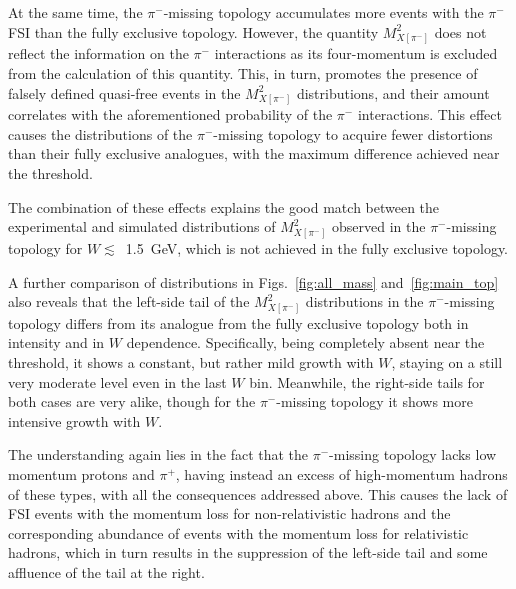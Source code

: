 At the same time, the $\pi^{-}$-missing topology accumulates more events with the $\pi^{-}$ FSI than the fully exclusive topology. However, the quantity $M^{2}_{X[\pi^{-}]}$ does not reflect the information on the $\pi^{-}$ interactions as its four-momentum is excluded from the calculation of this quantity. This, in turn, promotes the presence of falsely defined quasi-free events in the $M^{2}_{X[\pi^{-}]}$ distributions, and their amount correlates with the aforementioned probability of the $\pi^{-}$ interactions. This effect causes the distributions of the $\pi^{-}$-missing topology to acquire fewer distortions than their fully exclusive analogues, with the maximum difference achieved near the threshold.



The combination of these effects explains the good match between the experimental and simulated distributions of $M^{2}_{X[\pi^{-}]}$ observed in the $\pi^{-}$-missing topology for $W\lesssim$~1.5~GeV, which is not achieved in the fully exclusive topology. %

A further comparison of distributions in Figs.~\ref{fig:all_mass} and~\ref{fig:main_top} also reveals that the left-side tail of the $M^{2}_{X[\pi^{-}]}$ distributions in the $\pi^{-}$-missing topology differs from its analogue from the fully exclusive topology both in intensity and in $W$ dependence. Specifically, being completely absent near the threshold, it shows a constant, but rather mild growth with $W$, staying on a still very moderate level even in the last $W$ bin. Meanwhile, the right-side tails for both cases are very alike, though for the $\pi^{-}$-missing topology it shows more intensive growth with $W$. 


The understanding again lies in the fact that the $\pi^{-}$-missing topology lacks low momentum protons and $\pi^{+}$, having instead an excess of high-momentum hadrons of these types, with all the consequences addressed above. This causes the lack of FSI events with the momentum loss for non-relativistic hadrons and the corresponding abundance of events with the momentum loss for relativistic hadrons, which in turn results in the suppression of the left-side tail and some affluence of the tail at the right.


